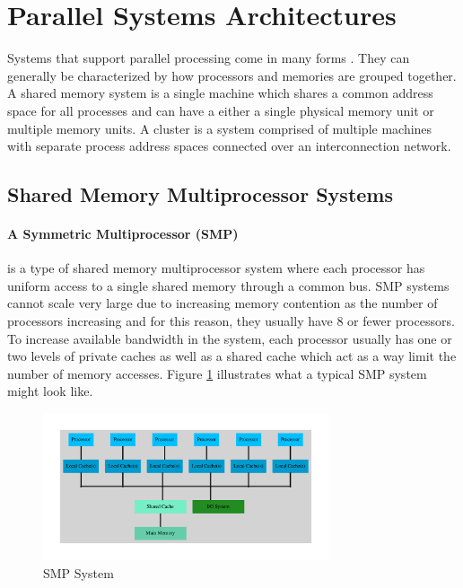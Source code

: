 \documentclass[11pt]{book}
\begin{document}
\section{Parallel Systems Architectures}

Systems that support parallel processing come in many forms \cite{culler-97,patterson-11}.  They can
generally be characterized by how processors and memories are grouped together.  A shared memory
system is a single machine which shares a common address space for all processes and can have a
either a single physical memory unit or multiple memory units.  A cluster is a system comprised of
multiple machines with separate process address spaces connected over an interconnection network.

\subsection{Shared Memory Multiprocessor Systems}

\paragraph{A Symmetric Multiprocessor (SMP)} is a type of shared memory multiprocessor
system where each processor has uniform access to a single shared memory through a common bus.  SMP
systems cannot scale very large due to increasing memory contention as the number of processors
increasing and for this reason, they usually have 8 or fewer processors.  To increase available
bandwidth in the system, each processor usually has one or two levels of private caches as well as a
shared cache which act as a way limit the number of memory accesses.  Figure \ref{smp} illustrates
what a typical SMP system might look like.

\begin{figure}
  \centering
  \includegraphics[width=0.75\textwidth,quiet]{figs/graphviz/smp.pdf}
  \caption{SMP System}\label{smp}
\end{figure}
\end{document}
